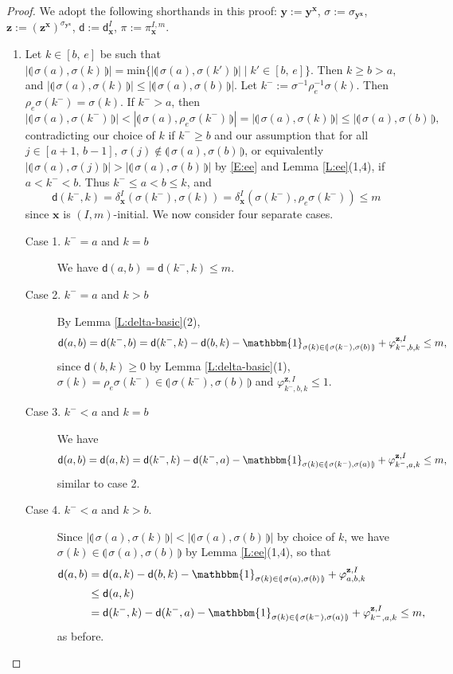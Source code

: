 \documentclass[11pt,a4paper,reqno]{amsart}
\numberwithin{equation}{section}
\theoremstyle{plain}
\theoremstyle{definition}
\theoremstyle{remark}
\numberwithin{equation}{section}
\newcommand{\bbone}{\mathbbm{1}}
\newcommand{\bx}{\mathbf{x}}
\newcommand{\by}{\mathbf{y}}
\newcommand{\bz}{\mathbf{z}}
\renewcommand{\min}{\mathrm{min}}
\newcommand{\rr}{\rho}
\newcommand{\ff}{\varphi}
\newcommand{\dd}{\mathsf{d}}
\newcommand{\ft}[2]{\llparenthesis\, #1,#2 \,\rrparenthesis}
\begin{document}
\begin{proof}
We adopt the following shorthands in this proof: $\by := \by^{\bx}$, $\sigma := \sigma_{\by^\bx}$, $\bz := (\bz^{\bx})^{\sigma_{\by^{\bx}}}$, $\dd := \dd_{\bx}^I$, $\pi := \pi_{\bx}^{I,m}$.
\begin{enumerate}
\item
Let $k \in [b,\,e]$ be such that $|\ft{\sigma(a)}{\sigma(k)}| = \min\{ |\ft{\sigma(a)}{\sigma(k')}| \mid  k' \in [b,\,e] \}$.
Then $k \geq b > a$, and $|\ft{\sigma(a)}{\sigma(k)}| \leq |\ft{\sigma(a)}{\sigma(b)}|$.
Let $k^- := \sigma^{-1}\rr_e^{-1}\sigma(k)$.
Then $\rr_e\sigma(k^-) = \sigma(k)$.
If $k^- > a$, then 
$$|\ft{\sigma(a)}{\sigma(k^-)}| < |\ft{\sigma(a)}{\rr_e\sigma(k^-)}| = |\ft{\sigma(a)}{\sigma(k)}| \leq |\ft{\sigma(a)}{\sigma(b)},$$
contradicting our choice of $k$ if $k^- \geq b$ and our assumption that for all $j \in [a+1,\, b-1]$, $\sigma(j) \notin \ft{\sigma(a)}{\sigma(b)}$, or equivalently
$|\ft{\sigma(a)}{\sigma(j)}| > |\ft{\sigma(a)}{\sigma(b)}|$ by \eqref{E:ee} and Lemma \ref{L:ee}(1,4), if $a< k^- < b$.
Thus $k^- \leq a < b \leq k$, and
$$
\dd(k^-,k) = \delta_{\bx}^I(\sigma(k^-), \sigma(k)) = \delta_{\bx}^I(\sigma(k^-), \rr_e\sigma(k^-)) \leq m$$
since $\bx$ is $(I,m)$-initial.
We now consider four separate cases.
\begin{description}
\item[Case 1. $k^- = a$ and $k=b$] We have $\dd(a,b) = \dd(k^-,k)  \leq m$.

\item[Case 2. $k^- = a$ and $k > b$]
By Lemma \ref{L:delta-basic}(2),
\begin{align*}
\dd(a, b) &= \dd(k^-,b) = \dd(k^-, k) - \dd(b,k) - \bbone_{\sigma(k) \in \ft{\sigma(k^-)}{\sigma(b)}} + \ff^{\bz,I}_{k^-,b,k} 
 \leq m,
\end{align*}
since $\dd(b,k) \geq 0$ by Lemma \ref{L:delta-basic}(1), $\sigma(k) = \rr_e\sigma(k^-) \in \ft{\sigma(k^-)}{\sigma(b)}$ and $\ff^{\bz,I}_{k^-,b,k} \leq 1$.

\item[Case 3. $k^- < a$ and $k= b$]
We have
\begin{align*}
\dd(a, b) = \dd(a,k) &= \dd(k^-, k) - \dd(k^-,a) - \bbone_{\sigma(k) \in \ft{\sigma(k^-)}{\sigma(a)}} + \ff^{\bz,I}_{k^-,a,k} %
\leq m,
\end{align*}
similar to case 2.

\item[Case 4. $k^- < a$ and $k > b$.]
Since $|\ft{\sigma(a)}{\sigma(k)}| < |\ft{\sigma(a)}{\sigma(b)}|$ by choice of $k$,
we have $\sigma(k) \in \ft{\sigma(a)}{\sigma(b)}$ by Lemma \ref{L:ee}(1,4), so that
\begin{align*}
\dd(a, b) &= \dd(a, k) - \dd(b,k) - \bbone_{\sigma(k) \in \ft{\sigma(a)}{\sigma(b)}} + \ff^{\bz,I}_{a,b,k} \\
&\leq \dd(a, k) \\
&= \dd(k^-,k) - \dd(k^-,a) - \bbone_{\sigma(k) \in \ft{\sigma(k^-)}{\sigma(a)}} + \ff^{\bz,I}_{k^-,a,k} \leq m,
\end{align*}
as before.
\end{description}


\end{enumerate}
\end{proof}
\end{document}
